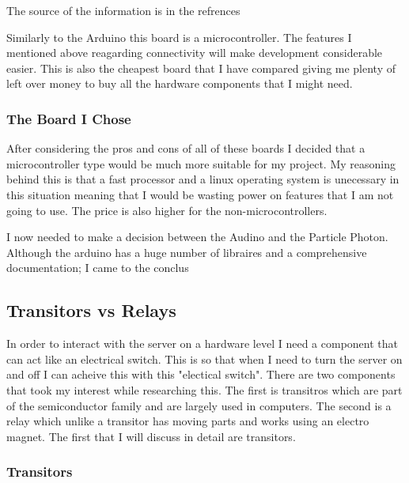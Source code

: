 \documentclass{article}
\begin{document}
The source of the information is in the refrences\cite{particlePhotonSpec}
\newline

Similarly to the Arduino this board is a microcontroller. The features I mentioned above reagarding
connectivity will make development considerable easier. This is also the cheapest board that I have
compared giving me plenty of left over money to buy all the hardware components that I might need.


\subsubsection{The Board I Chose}

After considering the pros and cons of all of these boards I decided that a microcontroller type
would be much more suitable for my project. My reasoning behind this is that a fast processor and
a linux operating system is unecessary in this situation meaning that I would be wasting power on
features that I am not going to use. The price is also higher for the non-microcontrollers.

I now needed to make a decision between the Audino and the Particle Photon. Although the arduino has
a huge number of libraires and a comprehensive documentation; I came to the conclus

\subsection{Transitors vs Relays}

In order to interact with the server on a hardware level I need a component that can act like an
electrical switch. This is so that when I need to turn the server on and off I can acheive this with
this "electical switch". There are two components that took my interest while researching this. The
first is transitros which are part of the semiconductor family and are largely used in computers. The
second is a relay which unlike a transitor has moving parts and works using an electro magnet. The first
that I will discuss in detail are transitors.

\subsubsection{Transitors}
\end{document}
